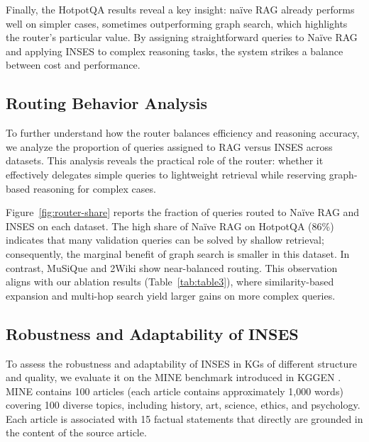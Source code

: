 \documentclass{article}
\theoremstyle{plain}
\theoremstyle{definition}
\theoremstyle{remark}
\begin{document}
Finally, the HotpotQA results reveal a key insight: naïve RAG already performs well on simpler cases, sometimes outperforming graph search, which highlights the router's particular value. By assigning straightforward queries to Naïve RAG and applying INSES to complex reasoning tasks, the system strikes a balance between cost and performance.


\subsection{Routing Behavior Analysis}

To further understand how the router balances efficiency and reasoning accuracy, we analyze the proportion of queries assigned to RAG versus INSES across datasets. This analysis reveals the practical role of the router: whether it effectively delegates simple queries to lightweight retrieval while reserving graph-based reasoning for complex cases.

Figure~\ref{fig:router-share} reports the fraction of queries routed to Naïve RAG and INSES on each dataset. The high share of Naïve RAG on HotpotQA (86\%) indicates that many validation queries can be solved by shallow retrieval; consequently, the marginal benefit of graph search is smaller in this dataset. 
In contrast, MuSiQue and 2Wiki show near-balanced routing. This observation aligns with our ablation results (Table~\ref{tab:table3}), where similarity-based expansion and multi-hop search yield larger gains on more complex queries. 

\subsection{Robustness and Adaptability of INSES}\label{robust_results}

To assess the robustness and adaptability of INSES in KGs of different structure and quality, we evaluate it on the MINE benchmark introduced in KGGEN \citep{mo2025kggen}. MINE contains 100 articles (each article contains approximately 1,000 words) covering 100 diverse topics, including history, art, science, ethics, and psychology. Each article is associated with 15 factual statements that directly are grounded in the content of the source article.
\end{document}
